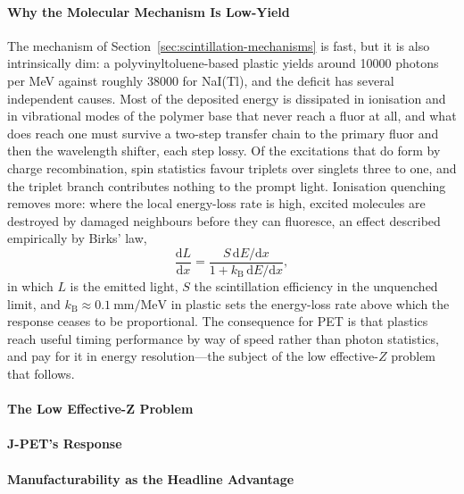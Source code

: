 \paragraph{Why the Molecular Mechanism Is Low-Yield}
The mechanism of Section~\ref{sec:scintillation-mechanisms} is fast, but it is also intrinsically dim: a polyvinyltoluene-based plastic yields around \num{10000} photons per \unit{\mega\electronvolt} against roughly \num{38000} for NaI(Tl), and the deficit has several independent causes.
Most of the deposited energy is dissipated in ionisation and in vibrational modes of the polymer base that never reach a fluor at all, and what does reach one must survive a two-step transfer chain to the primary fluor and then the wavelength shifter, each step lossy.
Of the excitations that do form by charge recombination, spin statistics favour triplets over singlets three to one, and the triplet branch contributes nothing to the prompt light.
Ionisation quenching removes more: where the local energy-loss rate is high, excited molecules are destroyed by damaged neighbours before they can fluoresce, an effect described empirically by Birks' law,
\begin{equation}
	\frac{\mathrm{d}L}{\mathrm{d}x} = \frac{S \, \mathrm{d}E/\mathrm{d}x}{1 + k_\mathrm{B} \, \mathrm{d}E/\mathrm{d}x},
	\label{eq:birks}
\end{equation}
in which $L$ is the emitted light, $S$ the scintillation efficiency in the unquenched limit, and $k_\mathrm{B} \approx \qty{0.1}{\milli\metre\per\mega\electronvolt}$ in plastic sets the energy-loss rate above which the response ceases to be proportional.
The consequence for PET is that plastics reach useful timing performance by way of speed rather than photon statistics, and pay for it in energy resolution---the subject of the low effective-$Z$ problem that follows.

\paragraph{The Low Effective-Z Problem}

\paragraph{J-PET's Response}

\paragraph{Manufacturability as the Headline Advantage}

